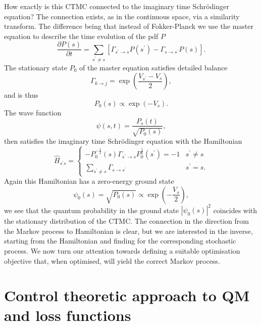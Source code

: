 How exactly is this CTMC connected to the imaginary time Schr\" odinger equation? The connection exists, as in the continuous space, via a similarity transform. The difference being that instead of Fokker-Planck we use the master equation to describe the time evolution of the pdf $P$
\begin{equation}
\frac{\partial P(s)}{\partial t}=\sum_{s^\prime \neq s}\left[\Gamma_{s^\prime \rightarrow s} P(s^\prime)-\Gamma_{s \rightarrow s^\prime} P(s)\right].
\end{equation}
The stationary state $P_0$ of the master equation satisfies detailed balance
\begin{equation}
	\Gamma_{k \rightarrow j}=\exp \left(\frac{V_{s^\prime}-V_{s}}{2}\right),
\end{equation}
and is thus
\begin{equation}
	P_{0}(s) \propto \exp \left(-V_{s}\right).
\end{equation}
The wave function 
\begin{equation}
	\psi(s, t)=\frac{P_{s}(t)}{\sqrt{P_{0}(s)}},
\end{equation}
then satisfies the imaginary time Schr\" odinger equation with the Hamiltonian
\begin{equation}
	\hat H_{s^\prime s}=\left\{\begin{array}{ll}
	-P_{0}^{-\frac{1}{2}}(s) \Gamma_{s^\prime \rightarrow s} P_{0}^{\frac{1}{2}}(s^\prime)=-1 & s^\prime \neq s \\
	\sum_{s^\prime \neq s} \Gamma_{s \rightarrow s^\prime} & s^\prime=s.
	\end{array}\right. 
\end{equation}
Again this Hamiltonian has a zero-energy ground state 
\begin{equation}
	\psi_{0}(s)=\sqrt{P_{0}(s)} \propto \exp \left(-\frac{V_{s}}{2}\right),
\end{equation}
we see that the quantum probability in the ground state $|\psi_0(s)|^2$ coincides with the stationary distribution of the CTMC. The connection in the direction from the Markov process to Hamiltonian is clear, but we are interested in the inverse, starting from the Hamiltonian and finding for the corresponding stochastic process. We now turn our attention towards defining a suitable optimisation objective that, when optimised, will yield the correct Markov process.

\section{Control theoretic approach to QM and loss functions}
\label{sec:control_loss}
